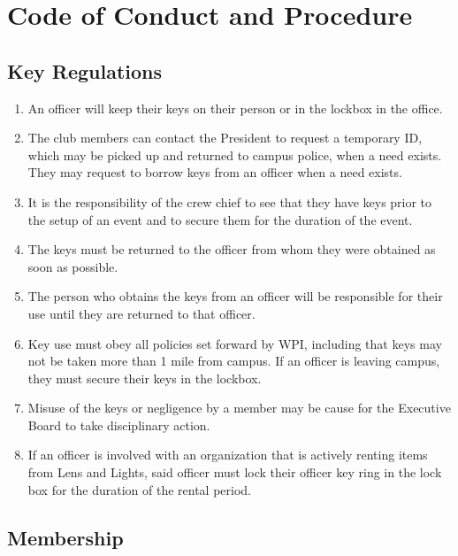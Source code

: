 \documentclass[12pt,letterpaper,oneside]{book}
\begin{document}
\chapter{Code of Conduct and Procedure}

\section{Key Regulations}

\begin{enumerate}

\item An officer will keep their keys on their person or in the lockbox in the office.
\item The club members can contact the President to request a temporary ID, which may be picked up and returned to campus police, when a need exists. They may request to borrow keys from an officer when a need exists.
\item It is the responsibility of the crew chief to see that they have keys prior to the setup of an event and to secure them for the duration of the event.
\item The keys must be returned to the officer from whom they were obtained as soon as possible.
\item The person who obtains the keys from an officer will be responsible for their use until they are returned to that officer.
\item Key use must obey all policies set forward by WPI, including that keys may not be taken more than 1 mile from campus. If an officer is leaving campus, they must secure their keys in the lockbox.
\item Misuse of the keys or negligence by a member may be cause for the Executive Board to take disciplinary action.
\item If an officer is involved with an organization that is actively renting items from Lens and Lights, said officer must lock their officer key ring in the lock box for the duration of the rental period.

\end{enumerate}

\section{Membership}
\end{document}
